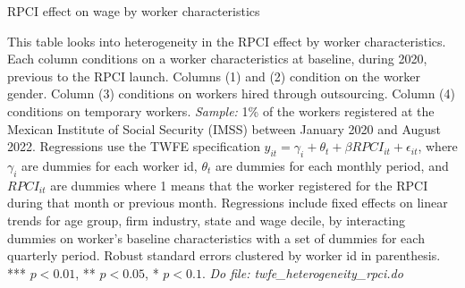 \documentclass[oneside,11pt]{article}
\begin{document}
\begin{table}[H]
    \caption{RPCI effect on wage by worker characteristics}
    \label{twfe_wage_hetero_wrk_char}
    \begin{center}
    \scriptsize{}
    \end{center}
\end{table}
\scriptsize{
\noindent This table looks into heterogeneity in the RPCI effect by worker characteristics. Each column conditions on a worker characteristics at baseline, during 2020, previous to the RPCI launch. Columns (1) and (2) condition on the worker gender. Column (3) conditions on workers hired through outsourcing. Column (4) conditions on temporary workers. \textit{Sample:} 1\% of the workers registered at the Mexican Institute of Social Security (IMSS) between January 2020 and August 2022. Regressions use the TWFE specification $y_{it} = \gamma_{i} + \theta_{t}+ \beta RPCI_{it} +\epsilon_{it}$, where $\gamma_{i}$ are dummies for each worker id, $\theta_{t}$ are dummies for each monthly period, and $RPCI_{it}$ are dummies where 1 means that the worker registered for the RPCI during that month or previous month. Regressions include fixed effects on linear trends for age group, firm industry, state and wage decile, by interacting dummies on worker's baseline characteristics with a set of dummies for each quarterly period. Robust standard errors clustered by worker id in parenthesis. *** $p<0.01$, ** $p<0.05$, * $p<0.1$.
\textit{Do file: twfe\_heterogeneity\_rpci.do}
}

\clearpage
\end{document}
